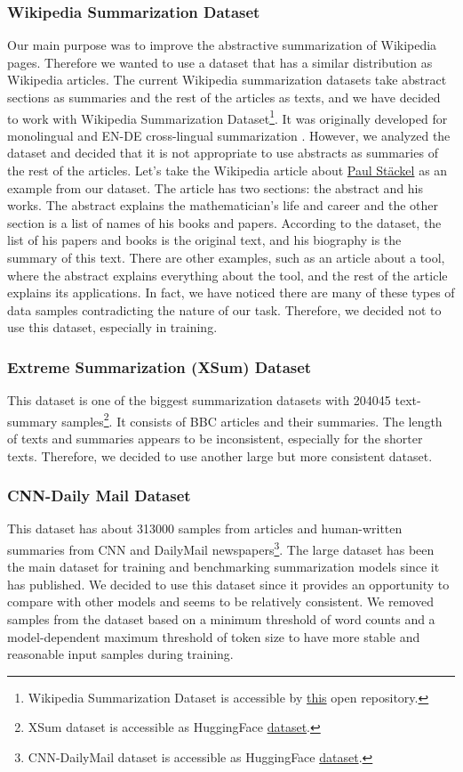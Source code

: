 \documentclass[11pt]{article}
\begin{document}
\subsubsection{Wikipedia Summarization Dataset}
Our main purpose was to improve the abstractive summarization of Wikipedia pages. Therefore we wanted to use a dataset that has a similar distribution as Wikipedia articles. The current Wikipedia summarization datasets take abstract sections as summaries and the rest of the articles as texts, and we have decided to work with Wikipedia Summarization Dataset\footnote{Wikipedia Summarization Dataset is accessible by \href{https://github.com/mehwishfatimah/wsd}{this} open repository.}. It was originally developed for monolingual and EN-DE cross-lingual summarization \cite{wsd}. However, we analyzed the dataset and decided that it is not appropriate to use abstracts as summaries of the rest of the articles. Let's take the Wikipedia article about \href{https://en.wikipedia.org/wiki/Paul_St%C3%A4ckel}{Paul Stäckel} as an example from our dataset. The article has two sections: the abstract and his works. The abstract explains the mathematician's life and career and the other section is a list of names of his books and papers. According to the dataset, the list of his papers and books is the original text, and his biography is the summary of this text. There are other examples, such as an article about a tool, where the abstract explains everything about the tool, and the rest of the article explains its applications. In fact, we have noticed there are many of these types of data samples contradicting the nature of our task. Therefore, we decided not to use this dataset, especially in training.

\subsubsection{Extreme Summarization (XSum) Dataset}
This dataset is one of the biggest summarization datasets with 204045 text-summary samples\footnote{XSum dataset is accessible as HuggingFace \href{https://huggingface.co/datasets/xsum}{dataset}.}. It consists of BBC articles and their summaries. The length of texts and summaries appears to be inconsistent, especially for the shorter texts. Therefore, we decided to use another large but more consistent dataset.


\subsubsection{CNN-Daily Mail Dataset}
This dataset has about 313000 samples from articles and human-written summaries from CNN and DailyMail newspapers\footnote{CNN-DailyMail dataset is accessible as HuggingFace \href{https://huggingface.co/datasets/cnn_dailymail}{dataset}.}. The large dataset has been the main dataset for training and benchmarking summarization models since it has published. We decided to use this dataset since it provides an opportunity to compare with other models and seems to be relatively consistent. We removed samples from the dataset based on a minimum threshold of word counts and a model-dependent maximum threshold of token size to have more stable and reasonable input samples during training.
\end{document}
